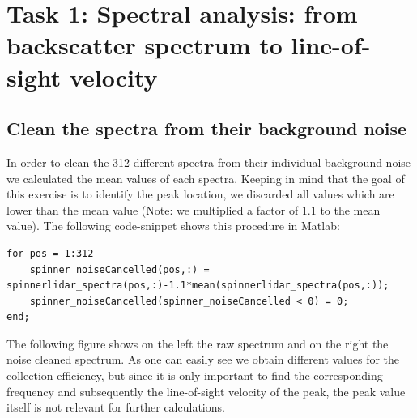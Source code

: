\documentclass[10pt]{article}
\begin{document}
\section{Task 1: Spectral analysis: from backscatter spectrum to line-of-sight velocity}
\subsection{Clean the spectra from their background noise}
In order to clean the 312 different spectra from their individual background noise we calculated the mean values of each spectra. Keeping in mind that the goal of this exercise is to identify the peak location, we discarded all values which are lower than the mean value (Note: we multiplied a factor of 1.1 to the mean value).
The following code-snippet shows this procedure in Matlab:

\begin{lstlisting}
for pos = 1:312
    spinner_noiseCancelled(pos,:) = spinnerlidar_spectra(pos,:)-1.1*mean(spinnerlidar_spectra(pos,:));
    spinner_noiseCancelled(spinner_noiseCancelled < 0) = 0;
end;
\end{lstlisting}

The following figure shows on the left the raw spectrum and on the right the noise cleaned spectrum. As one can easily see we obtain different values for the collection efficiency, but since it is only important to find the corresponding frequency and subsequently the line-of-sight velocity of the peak, the peak value itself is not relevant for further calculations.
\end{document}
